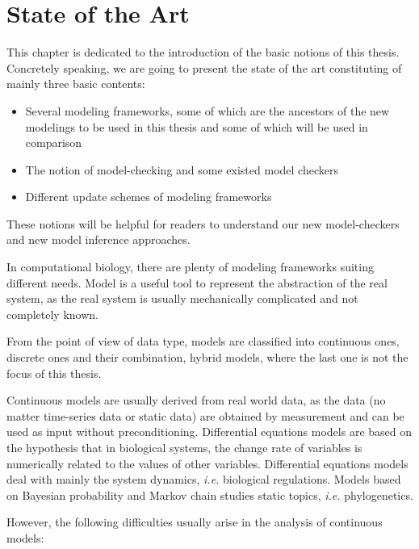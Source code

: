 \chapter{State of the Art}\label{chap:stateOfTheArt}

\begin{mybox}
This chapter is dedicated to the introduction of the basic notions of this thesis.
Concretely speaking, we are going to present the state of the art constituting of mainly three basic contents:

\begin{itemize}
    \item Several modeling frameworks, some of which are the ancestors of the new modelings to be used in this thesis and some of which will be used in comparison
    \item The notion of model-checking and some existed model checkers 
    \item Different update schemes of modeling frameworks
\end{itemize}

These notions will be helpful for readers to understand our new model-checkers and new model inference approaches.
\end{mybox}

In computational biology, there are plenty of modeling frameworks suiting different needs.
Model is a useful tool to represent the abstraction of the real system, as the real system is usually mechanically complicated and not completely known.

From the point of view of data type, models are classified into continuous ones, discrete ones and their combination, hybrid models, where the last one is not the focus of this thesis.

Continuous models are usually derived from real world data, as the data (no matter time-series data or static data) are obtained by measurement and can be used as input without preconditioning.
Differential equations models \cite{glass1973logical,snoussi1989qualitative,thomas1990biological} are based on the hypothesis that in biological systems, the change rate of variables is numerically related to the values of other variables. 
Differential equations models deal with mainly the system dynamics, \textit{i.e.} biological regulations.
Models based on Bayesian probability and Markov chain \cite{huelsenbeck2001mrbayes,larget1999markov} studies static topics, \textit{i.e.} phylogenetics.

However, the following difficulties usually arise in the analysis of continuous models:

